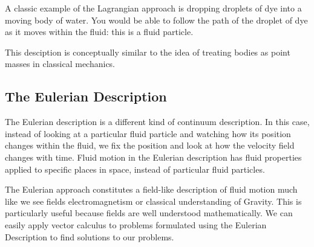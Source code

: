 A classic example of the Lagrangian approach is dropping droplets of dye into a moving body of water. You would be able to follow the path of the droplet of dye as it moves within the fluid: this is a fluid particle.

This desciption is conceptually similar to the idea of treating bodies as point masses in classical mechanics.

\subsection*{The Eulerian Description}

The Eulerian description is a different kind of continuum description. In this case, instead of looking at a particular fluid particle and watching how its position changes within the fluid, we fix the position and look at how the velocity field changes with time. Fluid motion in the Eulerian description has fluid properties applied to specific places in space, instead of particular fluid particles.

The Eulerian approach constitutes a field-like description of fluid motion much like we see fields electromagnetism or classical understanding of Gravity. This is particularly useful because fields are well understood mathematically. We can easily apply vector calculus to problems formulated using the Eulerian Description to find solutions to our problems. 

